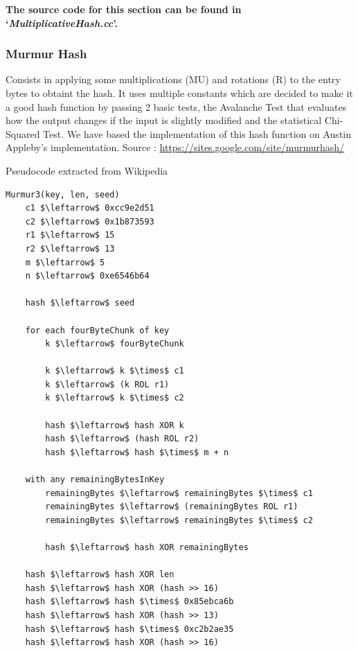 \documentclass[12pt]{article}
\begin{document}
\textbf{The source code for this section can be found in `\textit{MultiplicativeHash.cc}'.}
\bigskip



\subsubsection{Murmur Hash}

Consists in applying some multiplications (MU) and rotations (R) to the entry bytes to obtaint the hash. It uses multiple constants which are decided to make it a good hash function by passing 2 basic tests, the Avalanche Test that evaluates how the output changes if the input is slightly modified and the statistical Chi-Squared Test. We have based the implementation of this hash function on Austin Appleby's implementation. Source : \url{https://sites.google.com/site/murmurhash/}\\
\medskip
\begin{center}
\begin{large}
Pseudocode extracted from Wikipedia
\end{large}
\end{center}

\begin{lstlisting}[mathescape=true]
Murmur3(key, len, seed)
    c1 $\leftarrow$ 0xcc9e2d51
    c2 $\leftarrow$ 0x1b873593
    r1 $\leftarrow$ 15
    r2 $\leftarrow$ 13
    m $\leftarrow$ 5
    n $\leftarrow$ 0xe6546b64
 
    hash $\leftarrow$ seed

    for each fourByteChunk of key
        k $\leftarrow$ fourByteChunk

        k $\leftarrow$ k $\times$ c1
        k $\leftarrow$ (k ROL r1)
        k $\leftarrow$ k $\times$ c2

        hash $\leftarrow$ hash XOR k
        hash $\leftarrow$ (hash ROL r2)
        hash $\leftarrow$ hash $\times$ m + n

    with any remainingBytesInKey
        remainingBytes $\leftarrow$ remainingBytes $\times$ c1
        remainingBytes $\leftarrow$ (remainingBytes ROL r1)
        remainingBytes $\leftarrow$ remainingBytes $\times$ c2

        hash $\leftarrow$ hash XOR remainingBytes
 
    hash $\leftarrow$ hash XOR len
    hash $\leftarrow$ hash XOR (hash >> 16)
    hash $\leftarrow$ hash $\times$ 0x85ebca6b
    hash $\leftarrow$ hash XOR (hash >> 13)
    hash $\leftarrow$ hash $\times$ 0xc2b2ae35
    hash $\leftarrow$ hash XOR (hash >> 16)

\end{lstlisting}
\end{document}
